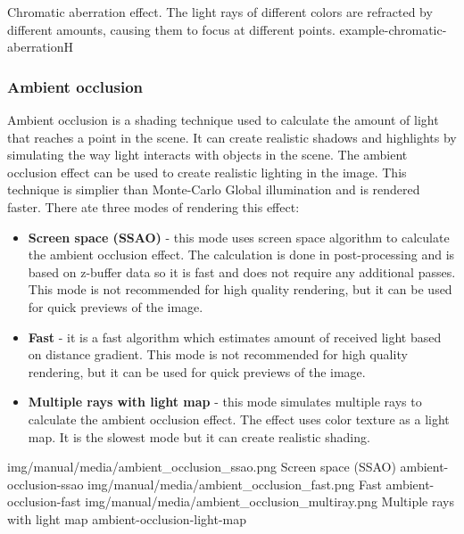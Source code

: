 {Chromatic aberration effect. The light rays of different colors are refracted by different amounts, causing them to focus at different points.}
{example-chromatic-aberration}{H}

\subsubsection{Ambient occlusion}\label{effects-ray-tracing-ambient-occlusion}

Ambient occlusion is a shading technique used to calculate the amount of light that reaches a point in the scene. It can create realistic shadows and highlights by simulating the way light interacts with objects in the scene. The ambient occlusion effect can be used to create realistic lighting in the image. This technique is simplier than Monte-Carlo Global illumination and is rendered faster. 
There ate three modes of rendering this effect:
\begin{itemize}
    \item \textbf{Screen space (SSAO)} - this mode uses screen space algorithm to calculate the ambient occlusion effect. The calculation is done in post-processing and is based on z-buffer data so it is fast and does not require any additional passes. This mode is not recommended for high quality rendering, but it can be used for quick previews of the image.
    
    \item \textbf{Fast} - it is a fast algorithm which estimates amount of received light based on distance gradient. This mode is not recommended for high quality rendering, but it can be used for quick previews of the image.

    \item \textbf{Multiple rays with light map} - this mode simulates multiple rays to calculate the ambient occlusion effect. The effect uses color texture as a light map. It is the slowest mode but it can create realistic shading. 
   
\end{itemize}

\threeImagesWithTwoCaptionsFullWidth
{img/manual/media/ambient_occlusion_ssao.png}
{Screen space (SSAO)}
{ambient-occlusion-ssao}
{img/manual/media/ambient_occlusion_fast.png}
{Fast}
{ambient-occlusion-fast}
{img/manual/media/ambient_occlusion_multiray.png}
{Multiple rays with light map}
{ambient-occlusion-light-map}

